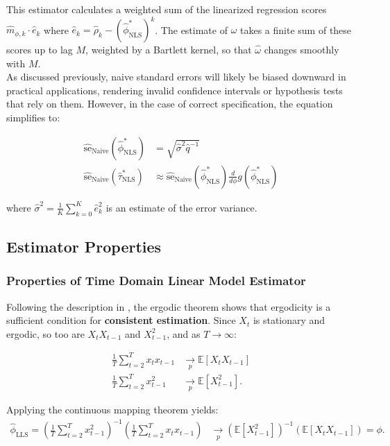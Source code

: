\documentclass[main.tex]{subfiles}
\begin{document}
This estimator calculates a weighted sum of the linearized regression scores $\hat m_{\phi, k} \cdot \hat e_k$ where $\hat e_k = \hat\rho_k - (\hat\phi^*_{\scriptscriptstyle\text{NLS}})^k$. The estimate of $\hat\omega$ takes a finite sum of these scores up to lag $M$, weighted by a Bartlett kernel, so that $\hat\omega$ changes smoothly with $M$.\\

As discussed previously, naive standard errors will likely be biased downward in practical applications, rendering invalid confidence intervals or hypothesis tests that rely on them. However, in the case of correct specification, the equation simplifies to:

\begin{align} 
    \widehat{\text{se}}_\text{Naive}(\hat\phi^*_{\scriptscriptstyle\text{NLS}}) &= \sqrt{\hat\sigma^2 \hat q^{-1}}\\
    \widehat{\text{se}}_\text{Naive}(\hat\tau^*_{\scriptscriptstyle\text{NLS}}) &\approx \widehat{\text{se}}_{\text{Naive}}(\hat\phi^*_{\scriptscriptstyle\text{NLS}}) \frac{d}{d\phi} g(\hat\phi^*_{\scriptscriptstyle\text{NLS}})
\end{align}

\noindent where $\hat\sigma^2 = \frac{1}{K} \sum_{k=0}^K \hat e_k^2$ is an estimate of the error variance.\\

\subsection{Estimator Properties}
\subsubsection{Properties of Time Domain Linear Model Estimator}
Following the description in \citet[theorem~14.29]{hansen_econometrics_2022}, the ergodic theorem shows that ergodicity is a sufficient condition for \textbf{consistent estimation}. Since $X_t$ is stationary and ergodic, so too are $X_t X_{t-1}$ and $X_{t-1}^2$, and as $T \to \infty$:

\begin{align*}
    \frac{1}{T} \sum_{t=2}^T x_t x_{t-1} &\underset{p}{\to} \mathbb{E}[X_t X_{t-1}]\\
    \frac{1}{T} \sum_{t=2}^T x_{t-1}^2 &\underset{p}{\to} \mathbb{E}[X_{t-1}^2].
\end{align*}

\noindent Applying the continuous mapping theorem yields:
\begin{align*}
    \hat\phi_{\scriptscriptstyle\text{LLS}} = (\frac{1}{T} \sum_{t=2}^T x_{t-1}^2)^{-1} ( \frac{1}{T} \sum_{t=2}^T x_t x_{t-1}) &\underset{p}{\to} (\mathbb{E}[X_{t-1}^2])^{-1}(\mathbb{E}[X_t X_{t-1}]) = \phi.
\end{align*}
\end{document}
